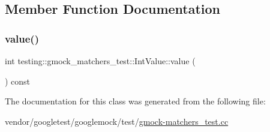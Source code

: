 \subsection{Member Function Documentation}
\mbox{\label{classtesting_1_1gmock__matchers__test_1_1_int_value_a6da000ea8ff787591e07ffaa3c1027d4}} 
\subsubsection{\texorpdfstring{value()}{value()}}
{\footnotesize\ttfamily int testing\+::gmock\+\_\+matchers\+\_\+test\+::\+Int\+Value\+::value (\begin{DoxyParamCaption}{ }\end{DoxyParamCaption}) const\hspace{0.3cm}{\ttfamily [inline]}}



The documentation for this class was generated from the following file\+:\begin{DoxyCompactItemize}
\item 
vendor/googletest/googlemock/test/\hyperlink{gmock-matchers__test_8cc}{gmock-\/matchers\+\_\+test.\+cc}\end{DoxyCompactItemize}
